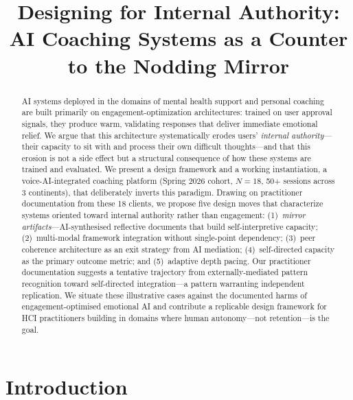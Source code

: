 \documentclass[sigchi,review,anonymous]{acmart}
\begin{document}
\title{Designing for Internal Authority: AI Coaching Systems as a Counter
       to the Nodding Mirror}


\begin{abstract}
AI systems deployed in the domains of mental health support and personal coaching are built
primarily on engagement-optimization architectures: trained on user approval signals, they
produce warm, validating responses that deliver immediate emotional relief. We argue that
this architecture systematically erodes users' \emph{internal authority}—their capacity to
sit with and process their own difficult thoughts—and that this erosion is not a side effect
but a structural consequence of how these systems are trained and evaluated. We present a
design framework and a working instantiation, a voice-AI-integrated coaching platform (Spring 2026 cohort, \(N=18\), 50+ sessions across
3 continents), that deliberately inverts this paradigm. Drawing on practitioner documentation
from these 18 clients, we propose five design moves that characterize systems oriented toward
internal authority rather than engagement: (1)~\emph{mirror artifacts}—AI-synthesised
reflective documents that build self-interpretive capacity; (2)~multi-modal framework
integration without single-point dependency; (3)~peer coherence architecture as an exit
strategy from AI mediation; (4)~self-directed capacity as the primary outcome metric; and
(5)~adaptive depth pacing. Our practitioner documentation suggests a tentative trajectory from externally-mediated
pattern recognition toward self-directed integration---a pattern warranting independent
replication. We situate these illustrative cases against the documented harms of
engagement-optimised emotional AI and contribute a replicable design framework for HCI
practitioners building in domains where human autonomy---not retention---is the goal.
\end{abstract}

\maketitle

\section{Introduction}
\end{document}
